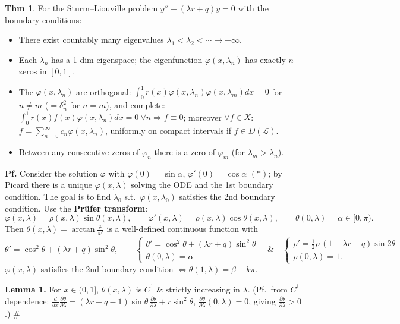 \documentclass[11pt]{article}
\theoremstyle{definition}
\newtheorem*{theorem}{Thm}
\theoremstyle{remark}
\begin{document}
\begin{theorem}
For the Sturm--Liouville problem $y''+(\lambda r+q)y=0$ with the boundary conditions:
\begin{itemize}
\item[(1)] There exist countably many eigenvalues $\lambda_1<\lambda_2<\cdots\to+\infty$.
\item[(2)] Each $\lambda_n$ has a 1-dim eigenspace; the eigenfunction $\varphi(x,\lambda_n)$ has
exactly $n$ zeros in $[0,1]$.
\item[(3)] The $\varphi(x,\lambda_n)$ are orthogonal:
$\int_0^1r(x)\varphi(x,\lambda_n)\varphi(x,\lambda_m)dx=0$ for $n\neq m$ ($=\delta_n^2$ for $n=m$),
and complete: $\int_0^1r(x)f(x)\varphi(x,\lambda_n)dx=0\ \forall n \Rightarrow f\equiv0$; moreover
$\forall f\in X$: $f=\sum_{n=0}^{\infty}c_n\varphi(x,\lambda_n)$, uniformly on compact intervals if
$f\in D(\mathcal{L})$.
\item[(4)] Between any consecutive zeros of $\varphi_n$ there is a zero of $\varphi_m$ (for
$\lambda_m>\lambda_n$).
\end{itemize}
\end{theorem}

\textbf{Pf.} Consider the solution $\varphi$ with $\varphi(0)=\sin\alpha$, $\varphi'(0)=\cos\alpha$
$(\ast)$; by Picard there is a unique $\varphi(x,\lambda)$ solving the ODE and the 1st boundary
condition. The goal is to find $\lambda_0$ s.t.\ $\varphi(x,\lambda_0)$ satisfies the 2nd boundary
condition. Use the \textbf{Pr\"ufer transform}:
\[
\varphi(x,\lambda)=\rho(x,\lambda)\sin\theta(x,\lambda), \qquad
\varphi'(x,\lambda)=\rho(x,\lambda)\cos\theta(x,\lambda), \qquad
\theta(0,\lambda)=\alpha\in[0,\pi).
\]
Then $\theta(x,\lambda)=\arctan\frac{\varphi}{\varphi'}$ is a well-defined continuous function with
\[
\theta'=\cos^2\theta+(\lambda r+q)\sin^2\theta, \qquad
\begin{cases} \theta'=\cos^2\theta+(\lambda r+q)\sin^2\theta\\ \theta(0,\lambda)=\alpha \end{cases}
\quad\&\quad
\begin{cases} \rho'=\frac12\rho\,(1-\lambda r-q)\sin2\theta\\ \rho(0,\lambda)=1. \end{cases}
\]
$\varphi(x,\lambda)$ satisfies the 2nd boundary condition $\iff\theta(1,\lambda)=\beta+k\pi$.

\textbf{Lemma 1.} For $x\in(0,1]$, $\theta(x,\lambda)$ is $C^1$ \& strictly increasing in $\lambda$.
(Pf.\ from $C^1$ dependence:
$\frac{d}{dx}\frac{\partial\theta}{\partial\lambda}=(\lambda r+q-1)\sin\theta\,\frac{\partial\theta}{\partial\lambda}+r\sin^2\theta$,
$\frac{\partial\theta}{\partial\lambda}(0,\lambda)=0$, giving $\frac{\partial\theta}{\partial\lambda}>0$.) \#
\end{document}
